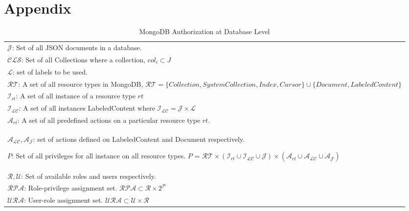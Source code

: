 \section{Appendix}
\begin{table*}[t] \footnotesize
	\centering
	\caption{MongoDB Authorization  at Database Level }
	\label{table:mongo-auth-model}
	\begin{tabular}{p{\textwidth}}
		
		\hline
		
		$\mathcal{J}$: Set of all JSON documents in a database.\\
		
		$\mathcal{CLS}$: Set of all Collections where a collection, $col_i \subset J$ \\
		
		$\mathcal{L}$: set of labels to be used. \\
		
		$\mathcal{RT}$: A set of  all resource types in MongoDB,   $  \mathcal{RT} = \{Collection, System Collection, Index, Cursor \} \cup \{\textit{Document}, \textit{LabeledContent}\}  $\\ 
		
		
		$\mathcal{I}_{rt}$: A set of all instance of a resource type $rt$  \\
		
		$\mathcal{I}_\mathcal{LC}$: A set of all instances LabeledContent where $\mathcal{I}_\mathcal{LC} = \mathcal{J} \times \mathcal{L}$    \\
		$\mathcal{A}_{rt}$: A set of all predefined actions on a particular resource type $rt$. \\
		
		$\mathcal{A}_\mathcal{LC}, \mathcal{A}_\mathcal{J}$: set of actions defined on LabeledContent and Document respectively.
		
		$P$: Set of all  privileges for all instance on all resource types. $P$ = $\mathcal{RT} \times ( \mathcal{I}_{rt} \cup \mathcal{I}_\mathcal{LC} \cup \mathcal{J})   \times  (\mathcal{A}_{rt} \cup  \mathcal{A}_\mathcal{LC} \cup \mathcal{A}_\mathcal{J})$\\
		
		$\mathcal {R}, \mathcal{U}$: Set of available roles and users respectively.\\
		
		$\mathcal{RPA}$: Role-privilege assignment set. $\mathcal{RPA} \subset  \mathcal{R}  \times 2^\mathcal{P}$ \\
		
		$\mathcal{URA}$: User-role assignment set. $\mathcal{URA} \subset  \mathcal{U}  \times \mathcal{R}$\\
		
		\hline
	\end{tabular}
\end{table*}

